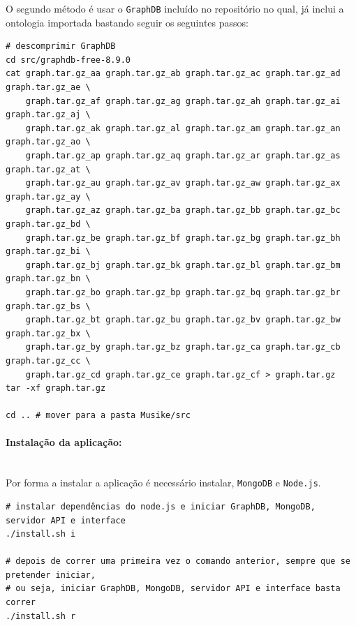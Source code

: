\documentclass{article}
\begin{document}
O segundo método é usar o \texttt{GraphDB} incluído no repositório no qual, já inclui a ontologia importada bastando seguir os seguintes passos:

\begin{framed}
\begin{verbatim}
# descomprimir GraphDB
cd src/graphdb-free-8.9.0
cat graph.tar.gz_aa graph.tar.gz_ab graph.tar.gz_ac graph.tar.gz_ad graph.tar.gz_ae \
    graph.tar.gz_af graph.tar.gz_ag graph.tar.gz_ah graph.tar.gz_ai graph.tar.gz_aj \
    graph.tar.gz_ak graph.tar.gz_al graph.tar.gz_am graph.tar.gz_an graph.tar.gz_ao \
    graph.tar.gz_ap graph.tar.gz_aq graph.tar.gz_ar graph.tar.gz_as graph.tar.gz_at \
    graph.tar.gz_au graph.tar.gz_av graph.tar.gz_aw graph.tar.gz_ax graph.tar.gz_ay \
    graph.tar.gz_az graph.tar.gz_ba graph.tar.gz_bb graph.tar.gz_bc graph.tar.gz_bd \
    graph.tar.gz_be graph.tar.gz_bf graph.tar.gz_bg graph.tar.gz_bh graph.tar.gz_bi \
    graph.tar.gz_bj graph.tar.gz_bk graph.tar.gz_bl graph.tar.gz_bm graph.tar.gz_bn \
    graph.tar.gz_bo graph.tar.gz_bp graph.tar.gz_bq graph.tar.gz_br graph.tar.gz_bs \
    graph.tar.gz_bt graph.tar.gz_bu graph.tar.gz_bv graph.tar.gz_bw graph.tar.gz_bx \
    graph.tar.gz_by graph.tar.gz_bz graph.tar.gz_ca graph.tar.gz_cb graph.tar.gz_cc \
    graph.tar.gz_cd graph.tar.gz_ce graph.tar.gz_cf > graph.tar.gz
tar -xf graph.tar.gz

cd .. # mover para a pasta Musike/src
\end{verbatim}
\end{framed}

\paragraph{Instalação da aplicação:}\mbox{}\\

Por forma a instalar a aplicação é necessário instalar, \texttt{MongoDB} e \texttt{Node.js}.

\begin{framed}
\begin{verbatim}
# instalar dependências do node.js e iniciar GraphDB, MongoDB, servidor API e interface
./install.sh i

# depois de correr uma primeira vez o comando anterior, sempre que se pretender iniciar,
# ou seja, iniciar GraphDB, MongoDB, servidor API e interface basta correr
./install.sh r
\end{verbatim}
\end{framed}
\end{document}
